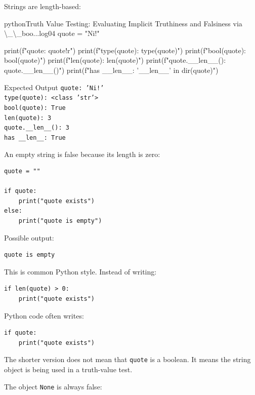 \documentclass[a4paper,twoside]{report}
\begin{document}
Strings are length-based:

\begin{codebox}[]{python}{Truth Value Testing: Evaluating Implicit Truthiness and Falsiness via \textbackslash{}\_\textbackslash{}\_boo...}{log04}
quote = "Ni!"

print(f"quote: {quote!r}")
print(f"type(quote): {type(quote)}")
print(f"bool(quote): {bool(quote)}")
print(f"len(quote): {len(quote)}")
print(f"quote.__len__(): {quote.__len__()}")
print(f"has __len__: {'__len__' in dir(quote)}")
\end{codebox}


\begin{iobox}{Expected Output}
\texttt{quote: 'Ni!'} \\
\texttt{type(quote): <class 'str'>} \\
\texttt{bool(quote): True} \\
\texttt{len(quote): 3} \\
\texttt{quote.\_\_len\_\_(): 3} \\
\texttt{has \_\_len\_\_: True} \\
\end{iobox}


An empty string is false because its length is zero:

\begin{verbatim}
quote = ""

if quote:
    print("quote exists")
else:
    print("quote is empty")
\end{verbatim}

Possible output:

\begin{verbatim}
quote is empty
\end{verbatim}

This is common Python style. Instead of writing:

\begin{verbatim}
if len(quote) > 0:
    print("quote exists")
\end{verbatim}

Python code often writes:

\begin{verbatim}
if quote:
    print("quote exists")
\end{verbatim}

The shorter version does not mean that \texttt{quote} is a boolean. It means the string object is being used in a truth-value test.

The object \texttt{None} is always false:
\end{document}
